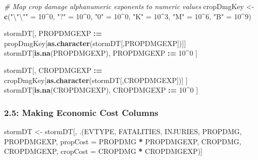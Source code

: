 \documentclass[
]{article}
\newenvironment{Shaded}{\begin{snugshade}}{\end{snugshade}}
\newcommand{\CharTok}[1]{\textcolor[rgb]{0.31,0.60,0.02}{#1}}
\newcommand{\CommentTok}[1]{\textcolor[rgb]{0.56,0.35,0.01}{\textit{#1}}}
\newcommand{\DataTypeTok}[1]{\textcolor[rgb]{0.13,0.29,0.53}{#1}}
\newcommand{\DecValTok}[1]{\textcolor[rgb]{0.00,0.00,0.81}{#1}}
\newcommand{\ErrorTok}[1]{\textcolor[rgb]{0.64,0.00,0.00}{\textbf{#1}}}
\newcommand{\KeywordTok}[1]{\textcolor[rgb]{0.13,0.29,0.53}{\textbf{#1}}}
\newcommand{\NormalTok}[1]{#1}
\newcommand{\OperatorTok}[1]{\textcolor[rgb]{0.81,0.36,0.00}{\textbf{#1}}}
\newcommand{\StringTok}[1]{\textcolor[rgb]{0.31,0.60,0.02}{#1}}
\begin{document}
\begin{Shaded}
\begin{Highlighting}[]
\CommentTok{# Map crop damage alphanumeric exponents to numeric values}
\NormalTok{cropDmgKey <-}\StringTok{  }\KeywordTok{c}\NormalTok{(}\StringTok{"}\CharTok{\textbackslash{}"\textbackslash{}"}\StringTok{"}\NormalTok{ =}\StringTok{ }\DecValTok{10}\OperatorTok{^}\DecValTok{0}\NormalTok{,}
                \StringTok{"?"}\NormalTok{ =}\StringTok{ }\DecValTok{10}\OperatorTok{^}\DecValTok{0}\NormalTok{, }
                \StringTok{"0"}\NormalTok{ =}\StringTok{ }\DecValTok{10}\OperatorTok{^}\DecValTok{0}\NormalTok{,}
                \StringTok{"K"}\NormalTok{ =}\StringTok{ }\DecValTok{10}\OperatorTok{^}\DecValTok{3}\NormalTok{,}
                \StringTok{"M"}\NormalTok{ =}\StringTok{ }\DecValTok{10}\OperatorTok{^}\DecValTok{6}\NormalTok{,}
                \StringTok{"B"}\NormalTok{ =}\StringTok{ }\DecValTok{10}\OperatorTok{^}\DecValTok{9}\NormalTok{)}

\NormalTok{stormDT[, PROPDMGEXP }\OperatorTok{:}\ErrorTok{=}\StringTok{ }\NormalTok{propDmgKey[}\KeywordTok{as.character}\NormalTok{(stormDT[,PROPDMGEXP])]]}
\NormalTok{stormDT[}\KeywordTok{is.na}\NormalTok{(PROPDMGEXP), PROPDMGEXP }\OperatorTok{:}\ErrorTok{=}\StringTok{ }\DecValTok{10}\OperatorTok{^}\DecValTok{0}\NormalTok{ ]}

\NormalTok{stormDT[, CROPDMGEXP }\OperatorTok{:}\ErrorTok{=}\StringTok{ }\NormalTok{cropDmgKey[}\KeywordTok{as.character}\NormalTok{(stormDT[,CROPDMGEXP])] ]}
\NormalTok{stormDT[}\KeywordTok{is.na}\NormalTok{(CROPDMGEXP), CROPDMGEXP }\OperatorTok{:}\ErrorTok{=}\StringTok{ }\DecValTok{10}\OperatorTok{^}\DecValTok{0}\NormalTok{ ]}
\end{Highlighting}
\end{Shaded}

\hypertarget{making-economic-cost-columns}{%
\subsubsection{2.5: Making Economic Cost
Columns}\label{making-economic-cost-columns}}

\begin{Shaded}
\begin{Highlighting}[]
\NormalTok{stormDT <-}\StringTok{ }\NormalTok{stormDT[, .(EVTYPE, FATALITIES, INJURIES, PROPDMG, PROPDMGEXP, }\DataTypeTok{propCost =}\NormalTok{ PROPDMG }\OperatorTok{*}\StringTok{ }\NormalTok{PROPDMGEXP, CROPDMG, CROPDMGEXP, }\DataTypeTok{cropCost =}\NormalTok{ CROPDMG }\OperatorTok{*}\StringTok{ }\NormalTok{CROPDMGEXP)]}
\end{Highlighting}
\end{Shaded}
\end{document}
